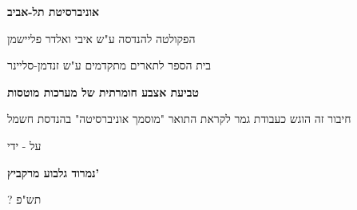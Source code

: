 \begin{otherlanguage}{hebrew}
\begin{titlepage}
\begin{center}
  \vspace*{1cm}
  
  \large
  \textbf{אוניברסיטת תל-אביב}
   
  \normalsize
  הפקולטה להנדסה ע"ש איבי ואלדר פליישמן
   
  בית הספר לתארים מתקדמים ע"ש זנדמן-סליינר
   
  \vspace{0.5cm}
  \Large
  \textbf{טביעת אצבע חומרתית של מערכות מוטסות}
   
  \vspace{0.5cm}
   
  \vspace{1cm}
  \normalsize
  חיבור זה הוגש כעבודת גמר לקראת התואר "מוסמך אוניברסיטה" בהנדסת חשמל
   
  \vspace{0.5cm}
  על - ידי
   
  \Large
  \textbf{נמרוד גלבוע מרקביץ'}
  
  \vspace{0.5cm}
  \large
  ? תש"פ
\end{center}
\end{titlepage}
\end{otherlanguage}
